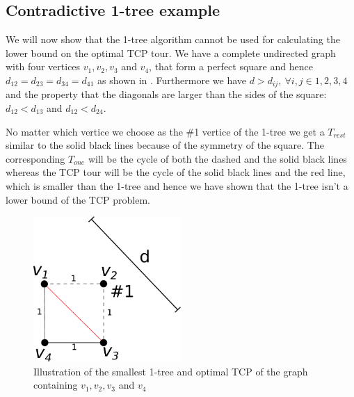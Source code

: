 \subsection{Contradictive 1-tree example}
We will now show that the 1-tree algorithm cannot be used for calculating the
lower bound on the optimal TCP tour. We have a complete undirected graph with
four vertices $v_1, v_2, v_3$ and $v_4$, that form a perfect square and hence
$d_{12} = d_{23} = d_{34} = d_{41}$ as shown in .
Furthermore we have $d > d_{ij},~\forall i,j \in {1,2,3,4}$ and the
property that the diagonals are larger than the sides of the square:
$d_{12} < d_{13}$ and $d_{12} < d_{24}$.

No matter which vertice we choose as the \#1 vertice of the 1-tree we get
a $T_{rest}$ similar to the solid black lines because of the symmetry of
the square. The corresponding $T_{one}$ will be the cycle of both the
dashed and the solid black lines whereas the TCP tour will be the cycle of
the solid black lines and the red line, which is smaller than the 1-tree
and hence we have shown that the 1-tree isn't a lower bound of the TCP
problem.

\begin{figure}
    \centering
    \includegraphics[width=0.5\textwidth]{drawing.pdf}
    \caption{Illustration of the smallest 1-tree and optimal TCP of the graph containing $v_1, v_2, v_3$ and $v_4$}
    \label{fig:ex12}
\end{figure}

